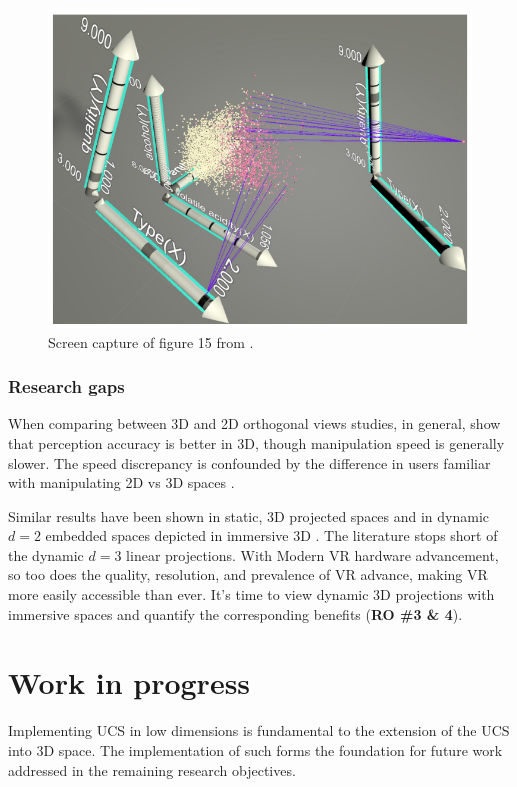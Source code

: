 \documentclass{monashthesis}
\begin{document}
\begin{figure}

{\centering \includegraphics[width=0.5\linewidth]{./figures/cordeil2017fig} 

}

\caption{Screen capture of figure 15 from
\textcite{cordeil_imaxes:_2017}.}\label{fig:cordeil2017fig}
\end{figure}

\subsection{Research gaps}\label{research-gaps-1}

When comparing between 3D and 2D orthogonal views studies, in general,
show that perception accuracy is better in 3D, though manipulation speed
is generally slower. The speed discrepancy is confounded by the
difference in users familiar with manipulating 2D vs 3D spaces
\autocites{lee_effects_1986}{wickens_implications_1994}{tory_visualization_2006}[counterexample][]{sedlmair_empirical_2013}.

Similar results have been shown in static, 3D projected spaces
\autocites{gracia_new_2016}{wagner_filho_immersive_2018} and in dynamic
\(d=2\) embedded spaces depicted in immersive 3D
\autocite{nelson_xgobi_1998}. The literature stops short of the dynamic
\(d=3\) linear projections. With Modern VR hardware advancement, so too
does the quality, resolution, and prevalence of VR advance, making VR
more easily accessible than ever. It's time to view dynamic 3D
projections with immersive spaces and quantify the corresponding
benefits (\textbf{RO \#3 \& 4}).

\chapter{Work in progress}\label{ch:workinprogress}

Implementing UCS in low dimensions is fundamental to the extension of
the UCS into 3D space. The implementation of such forms the foundation
for future work addressed in the remaining research objectives.
\end{document}
